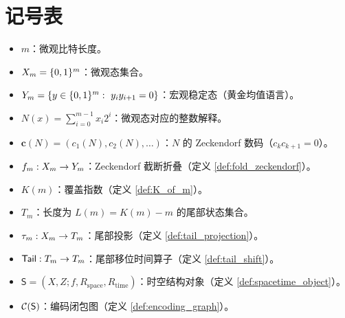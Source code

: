 \section{记号表}

\begin{itemize}
  \item $m$：微观比特长度。
  \item $X_m=\{0,1\}^m$：微观态集合。
  \item $Y_m=\{y\in\{0,1\}^m:\ y_i y_{i+1}=0\}$：宏观稳定态（黄金均值语言）。
  \item $N(x)=\sum_{i=0}^{m-1} x_i2^i$：微观态对应的整数解释。
  \item $\mathbf c(N)=(c_1(N),c_2(N),\dots)$：$N$ 的 Zeckendorf 数码（$c_kc_{k+1}=0$）。
  \item $f_m:X_m\to Y_m$：Zeckendorf 截断折叠（定义 \ref{def:fold_zeckendorf}）。
  \item $K(m)$：覆盖指数（定义 \ref{def:K_of_m}）。
  \item $T_m$：长度为 $L(m)=K(m)-m$ 的尾部状态集合。
  \item $\tau_m:X_m\to T_m$：尾部投影（定义 \ref{def:tail_projection}）。
  \item $\mathsf{Tail}:T_m\to T_m$：尾部移位时间算子（定义 \ref{def:tail_shift}）。
  \item $\mathsf S=(X,Z; f,R_{\mathrm{space}},R_{\mathrm{time}})$：时空结构对象（定义 \ref{def:spacetime_object}）。
  \item $\mathcal{C}(\mathsf S)$：编码闭包图（定义 \ref{def:encoding_graph}）。
\end{itemize}

